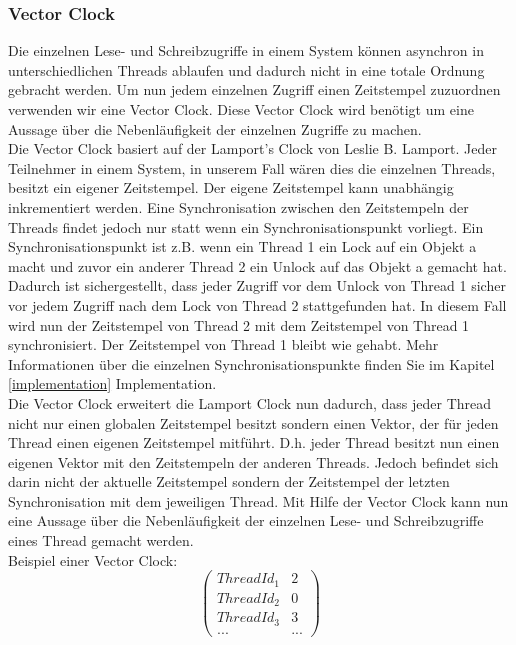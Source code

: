 \documentclass[10pt,a4paper]{article}
\begin{document}
\subsubsection{Vector Clock}
\begin{flushleft}
Die einzelnen Lese- und Schreibzugriffe in einem System können asynchron in unterschiedlichen Threads ablaufen und dadurch nicht in eine totale Ordnung gebracht werden. Um nun jedem einzelnen Zugriff einen Zeitstempel zuzuordnen verwenden wir eine Vector Clock. Diese Vector Clock wird benötigt um eine Aussage über die Nebenläufigkeit der einzelnen Zugriffe zu machen.\\
Die Vector Clock basiert auf der Lamport's Clock von Leslie B. Lamport. Jeder Teilnehmer in einem System, in unserem Fall wären dies die einzelnen Threads, besitzt ein eigener Zeitstempel. Der eigene Zeitstempel kann unabhängig inkrementiert werden. Eine Synchronisation zwischen den Zeitstempeln der Threads findet jedoch nur statt wenn ein Synchronisationspunkt vorliegt. Ein Synchronisationspunkt ist z.B. wenn ein Thread 1 ein Lock auf ein Objekt a macht und zuvor ein anderer Thread 2 ein Unlock auf das Objekt a gemacht hat. Dadurch ist sichergestellt, dass jeder Zugriff vor dem Unlock von Thread 1 sicher vor jedem Zugriff nach dem Lock von Thread 2 stattgefunden hat. In diesem Fall wird nun der Zeitstempel von Thread 2 mit dem Zeitstempel von Thread 1 synchronisiert. Der Zeitstempel von Thread 1 bleibt wie gehabt. Mehr Informationen über die einzelnen Synchronisationspunkte finden Sie im Kapitel \ref{implementation} Implementation.\\
Die Vector Clock erweitert die Lamport Clock nun dadurch, dass jeder Thread nicht nur einen globalen Zeitstempel besitzt sondern einen Vektor, der für jeden Thread einen eigenen Zeitstempel mitführt. D.h. jeder Thread besitzt nun einen eigenen Vektor mit den Zeitstempeln der anderen Threads. Jedoch befindet sich darin nicht der aktuelle Zeitstempel sondern der Zeitstempel der letzten Synchronisation mit dem jeweiligen Thread. Mit Hilfe der Vector Clock kann nun eine Aussage über die Nebenläufigkeit der einzelnen Lese- und Schreibzugriffe eines Thread gemacht werden.\\
Beispiel einer Vector Clock:\\
\[
	\begin{pmatrix}
		ThreadId_1 & 2\\
		ThreadId_2 & 0\\
		ThreadId_3 & 3\\
		... & ...
	\end{pmatrix}
\]
\end{flushleft}
\end{document}
